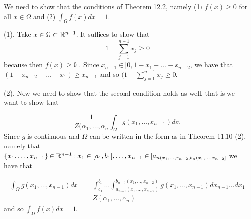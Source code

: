 

We need to show that the conditions of Theorem 12.2, namely (1) $ f(x) \geq 0$ for all $ x \in
\Omega$ and (2) $ \int_{\Omega}^{} f(x) dx = 1$. 

(1). Take $ x \in \Omega \subset \mathbb{R}^{n-1} $. It suffices
to show that 
\[
    1- \sum_{j=1}^{n-1} x_{j} \geq 0
\] 
because then $ f(x) \geq 0$ . Since $ x_{n-1} \in [0,1-x_1-\dots-x_{n-2} $, we have that $ (1-x_{n-2}
- \dots - x_1) \geq x_{n-1} $  and so $ (1- \sum_{j=1}^{n-1} x_{j}  \geq 0$. 

(2). Now we need to show that the second condition holds as well, that is we want to show that 

\[
    \frac{1}{Z(\alpha_1, \dots, \alpha_{n} } \int_{\Omega}^{} g(x_1, \dots, x_{n-1} ) dx
.\] 
Since $ g$ is continuous and $ \Omega$ can be written in the form as in Theorem 11.10 (2), namely
that $ \{ x_1, \dots, x_{n-1}  \} \in \mathbb{R}^{n-1} : x_1 \in [a_1,b_1], \dots, x_{n-1} \in
[a_{n(x_1,\dots, x_{n-2}, b_{n}(x_1, \dots, x_{n-2} ] }  $ we have that 

\begin{align*}
    \int_{\Omega}^{} g(x_1, \dots, x_{n-1} )dx &= \int_{a_1}^{b_1} \dots \int_{a_{n-1} (x_1, \dots,
    x_{n-2} )}^{b_{n-1}(x_1,\dots, x_{n-2} ) } g(x_1, \dots, x_{n-1} ) dx_{n-1} \dots dx_1\\
					       &= Z(\alpha_1, \dots, \alpha_{n} )
\end{align*}
and so $ \int_{\Omega}^{} f(x) dx = 1$.
